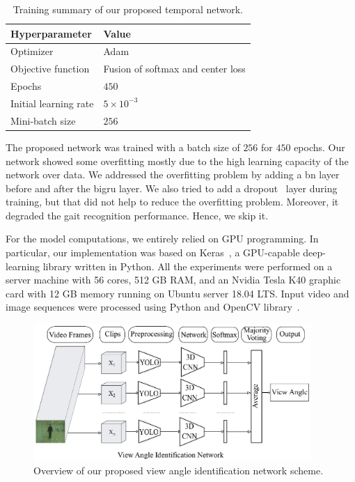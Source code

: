 \begin{table}
	\centering
	\caption{Training summary of our proposed temporal network. \label{table:summary_tn}}
	\begin{tabular*}{32pc}{@{\extracolsep{\fill}}ll@{}}
		\hline \noalign{\vspace{3pt}}
		\textbf{Hyperparameter} &\qquad \textbf{Value} \\ [3pt] \hline\noalign{\vspace{3pt}}
		Optimizer     			&\qquad Adam~\cite{Kingma_15} \\[3pt]
		Objective function  	&\qquad Fusion of softmax and center loss \\[3pt]
		Epochs        			&\qquad $ 450 $ \\ [3pt]
		Initial learning rate	&\qquad $5 \times 10^{-3}$  \\[3pt]
		Mini-batch size			&\qquad $ 256 $ \\
		\hline
	\end{tabular*}
\end{table}

The proposed network was trained with a batch size of $ 256 $ for $ 450 $ epochs. Our network showed some overfitting mostly due to the high learning capacity of the network over data. We addressed the overfitting problem by adding a \gls{bn} layer before and after the \gls{bigru} layer. We also tried to add a dropout~\cite{Srivastava_14} layer during training, but that did not help to reduce the overfitting problem. Moreover, it degraded the gait recognition performance. Hence, we skip it.

For the model computations, we entirely relied on GPU programming. In particular, our implementation was based on Keras~\cite{keras}, a GPU-capable deep-learning library written in Python. All the experiments were performed on a server machine with 56 cores, 512 GB RAM, and an Nvidia Tesla K40 graphic card with 12 GB memory running on Ubuntu server 18.04 LTS. Input video and image sequences were processed using Python and OpenCV library~\cite{opencv}.




\begin{figure}
	\centering
	\includegraphics[width=0.94\textwidth]{figures/view_angle_identification.eps}
	\caption[Overview of our proposed view angle identification network scheme] 
	{Overview of our proposed view angle identification network scheme. \label{fig:view_angle_identification}
	}
\end{figure}

